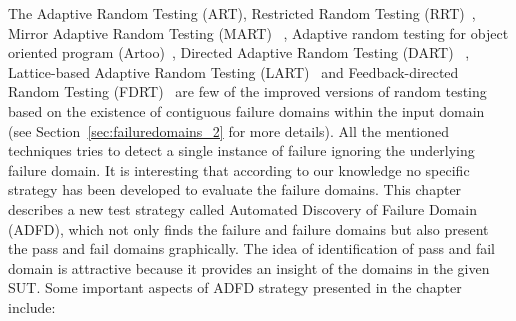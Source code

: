 





The Adaptive Random Testing (ART), Restricted Random Testing (RRT)~\cite{chan2006restricted}, Mirror Adaptive Random Testing (MART) ~\cite{chen2004mirror}, Adaptive random testing for object oriented program (Artoo)~\cite{ciupa2008artoo}, Directed Adaptive Random Testing (DART) ~\cite{godefroid2005dart}, Lattice-based Adaptive Random Testing (LART)~\cite{mayer2005lattice} and Feedback-directed Random Testing (FDRT)~\cite{pacheco2007randoop, pacheco2007feedback} are few of the improved versions of random testing based on the existence of contiguous failure domains within the input domain (see Section~\ref{sec:failuredomains_2} for more details). All the mentioned techniques tries to detect a single instance of failure ignoring the underlying failure domain. It is interesting that according to our knowledge no specific strategy has been developed to evaluate the failure domains. This chapter describes a new test strategy called Automated Discovery of Failure Domain (ADFD), which not only finds the failure and failure domains but also present the pass and fail domains graphically. The idea of identification of pass and fail domain is attractive because it provides an insight of the domains in the given SUT. Some important aspects of ADFD strategy presented in the chapter include:

